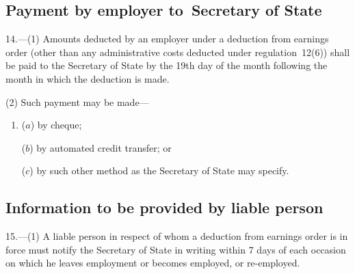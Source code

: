 \documentclass[12pt,a4paper]{article}
\begin{document}
\subsection[14. Payment by employer to~Secretary of State]{Payment by employer to~Secretary of State}

14.—(1) Amounts deducted by an employer under a deduction from earnings order (other than any administrative costs deducted under regulation~12(6)) shall be paid to the Secretary of State by the 19th day of the month following the month in which the deduction is made.

(2) Such payment may be made—
\begin{enumerate}\item[]
($a$) by cheque;

($b$) by automated credit transfer; or

($c$) by such other method as the Secretary of State may specify.
\end{enumerate}

\subsection[15. Information to be provided by liable person]{Information to be provided by liable person}

%
%
%

15.---(1)  A liable person in respect of whom a deduction from earnings order is in force must notify the Secretary of State in writing within 7 days of each occasion on which he leaves employment or becomes employed, or re-employed.
\end{document}

